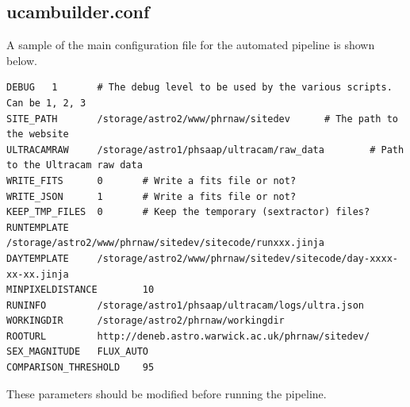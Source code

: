 \subsection{ucambuilder.conf}
A sample of the main configuration file for the automated pipeline is shown below.
\begin{lstlisting}
DEBUG   1       # The debug level to be used by the various scripts. Can be 1, 2, 3
SITE_PATH       /storage/astro2/www/phrnaw/sitedev      # The path to the website
ULTRACAMRAW     /storage/astro1/phsaap/ultracam/raw_data        # Path to the Ultracam raw data
WRITE_FITS      0       # Write a fits file or not?
WRITE_JSON      1       # Write a fits file or not?
KEEP_TMP_FILES  0       # Keep the temporary (sextractor) files?
RUNTEMPLATE     /storage/astro2/www/phrnaw/sitedev/sitecode/runxxx.jinja
DAYTEMPLATE     /storage/astro2/www/phrnaw/sitedev/sitecode/day-xxxx-xx-xx.jinja
MINPIXELDISTANCE        10
RUNINFO         /storage/astro1/phsaap/ultracam/logs/ultra.json
WORKINGDIR      /storage/astro2/phrnaw/workingdir
ROOTURL         http://deneb.astro.warwick.ac.uk/phrnaw/sitedev/
SEX_MAGNITUDE   FLUX_AUTO
COMPARISON_THRESHOLD    95
\end{lstlisting}

These parameters should be modified before running the pipeline.


